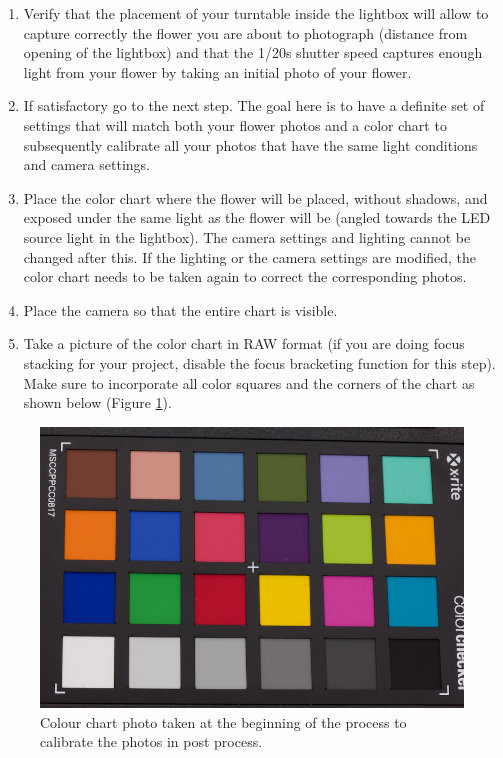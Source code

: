 \documentclass[
]{book}
\providecommand{\tightlist}{%
  \setlength{\itemsep}{0pt}\setlength{\parskip}{0pt}}
\begin{document}
\begin{enumerate}
  \begin{enumerate}
  \def\labelenumii{\alph{enumii}.}
  \tightlist
  \item
    \textbf{Without focus stacking}: A minimum of 163 photos, accounting for
    photos of labels and chart.
  \item
    \textbf{With focus stacking}: The total number of photos depends on the number of
    shots at each rotation point and the number of flower positions
    used (usually around 1,500 photos +-200).
  \end{enumerate}
\item
  Verify that the placement of your turntable inside the lightbox will
  allow to capture correctly the flower you are about to photograph
  (distance from opening of the lightbox) and that the 1/20s shutter
  speed captures enough light from your flower by taking an initial
  photo of your flower.
\item
  If satisfactory go to the next step. The goal here is to have a definite
  set of settings that will match both your flower photos and a color
  chart to subsequently calibrate all your photos that have the same
  light conditions and camera settings.
\item
  Place the color chart where the flower will be placed, without
  shadows, and exposed under the same light as the flower will be
  (angled towards the LED source light in the lightbox). The camera
  settings and lighting cannot be changed after this. If the lighting
  or the camera settings are modified, the color chart needs to be
  taken again to correct the corresponding photos.
\item
  Place the camera so that the entire chart is visible.
\item
  Take a picture of the color chart in RAW format (if you are doing focus stacking
  for your project, disable the focus bracketing function for this step). Make
  sure to incorporate all color squares and the corners of the chart as shown below (Figure \ref{fig:chart}).
\end{enumerate}

\begin{figure}

{\centering \includegraphics[width=0.4\linewidth]{Figures/chart_example} 

}

\caption{Colour chart photo taken at the beginning of the process to calibrate the photos in post process.}\label{fig:chart}
\end{figure}
\end{document}
